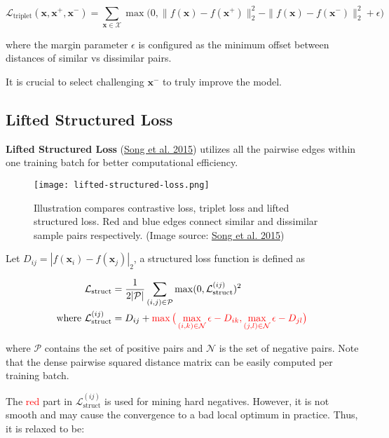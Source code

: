 \documentclass[12pt]{article}
\begin{document}
\[
\mathcal{L}_\text{triplet}(\mathbf{x}, \mathbf{x}^+, \mathbf{x}^-) = \sum_{\mathbf{x} \in \mathcal{X}} \max\big( 0, \|f(\mathbf{x}) - f(\mathbf{x}^+)\|^2_2 - \|f(\mathbf{x}) - f(\mathbf{x}^-)\|^2_2 + \epsilon \big)
\]

where the margin parameter $\epsilon$ is configured as the minimum offset between distances of similar vs dissimilar pairs.

It is crucial to select challenging $\mathbf{x}^-$ to truly improve the model.

\subsection{Lifted Structured Loss}

\textbf{Lifted Structured Loss} (\href{https://arxiv.org/abs/1511.06452}{Song et al. 2015}) utilizes all the pairwise edges within one training batch for better computational efficiency.

\begin{figure}[H]
    \centering
    \texttt{[image: lifted-structured-loss.png]}
    \caption{Illustration compares contrastive loss, triplet loss and lifted structured loss. Red and blue edges connect similar and dissimilar sample pairs respectively. (Image source: \href{https://arxiv.org/abs/1511.06452}{Song et al. 2015})}
\end{figure}

Let $D_{ij} = | f(\mathbf{x}_i) - f(\mathbf{x}_j) |_2$, a structured loss function is defined as

\[
\begin{aligned}
\mathcal{L}_\text{struct} &= \frac{1}{2\vert \mathcal{P} \vert} \sum_{(i,j) \in \mathcal{P}} \max(0, \mathcal{L}_\text{struct}^{(ij)})^2 \\
\text{where } \mathcal{L}_\text{struct}^{(ij)} &= D_{ij} + \color{red}{\max \big( \max_{(i,k)\in \mathcal{N}} \epsilon - D_{ik}, \max_{(j,l)\in \mathcal{N}} \epsilon - D_{jl} \big)}
\end{aligned}
\]

where $\mathcal{P}$ contains the set of positive pairs and $\mathcal{N}$ is the set of negative pairs. Note that the dense pairwise squared distance matrix can be easily computed per training batch.

The \textcolor{red}{red} part in $\mathcal{L}_\text{struct}^{(ij)}$ is used for mining hard negatives. However, it is not smooth and may cause the convergence to a bad local optimum in practice. Thus, it is relaxed to be:
\end{document}
